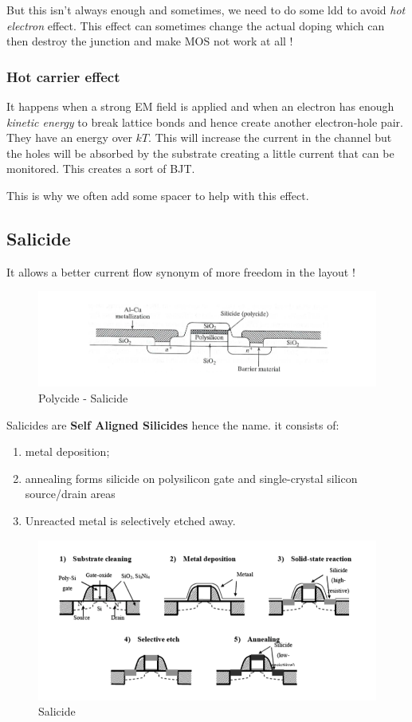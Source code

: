 \documentclass{report}
\begin{document}
But this isn't always enough and sometimes, we need to do some \gls{ldd} to avoid \textit{hot electron} effect. This effect can sometimes change the actual doping which can then destroy the junction and make MOS not work at all !

\subsubsection{Hot carrier effect}

It happens when a strong EM field is applied and when an electron has enough \textit{kinetic energy} to break lattice bonds and hence create another electron-hole pair. They have an energy over $kT$. This will increase the current in the channel but the holes will be absorbed by the substrate creating a little current that can be monitored. This creates a sort of BJT.

This is why we often add some spacer to help with this effect.

\subsection{Salicide}

It allows a better current flow synonym of more freedom in the layout !

\begin{figure}[H]
    \centering
    \includegraphics[width=0.5\linewidth]{polycide_salicide.png}
    \caption{Polycide - Salicide}
    \label{fig:enter-label}
\end{figure}

Salicides are \textbf{Self Aligned Silicides} hence the name. it consists of:

\begin{enumerate}
    \item metal deposition;
    \item annealing forms silicide on polysilicon gate and single-crystal silicon source/drain areas
    \item Unreacted metal is selectively etched away.
\end{enumerate}

\begin{figure}[H]
    \centering
    \includegraphics[width=0.5\linewidth]{salicide.png}
    \caption{Salicide}
    \label{fig:enter-label}
\end{figure}
\end{document}
